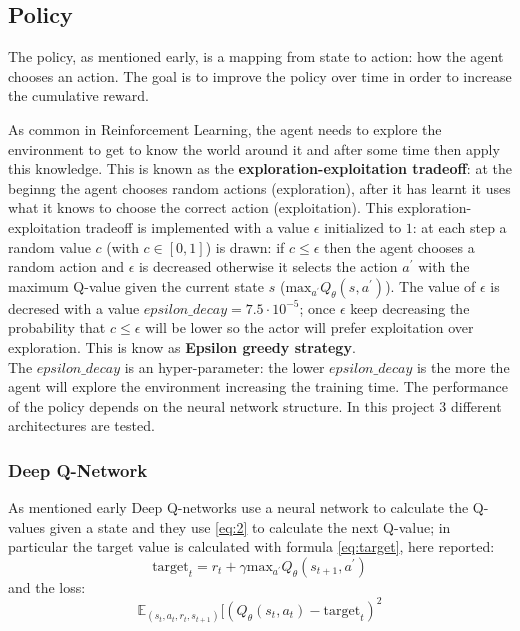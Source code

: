 \documentclass[14pt]{extarticle}
\def\sp{\vspace{5pt}}
\def\pp{\vspace{10pt}\newline}
\begin{document}
\begin{flushleft}
	
	\subsection{Policy}
	\sp
	The policy, as mentioned early, is a mapping from state to action: how the agent chooses an action. The goal is to improve the policy over time in order to increase the cumulative reward. \pp
	
	As common in Reinforcement Learning, the agent needs to explore the environment to get to know the world around it and after some time then apply this knowledge.  This is known as the \textbf{exploration-exploitation tradeoff}: at the beginng the agent chooses random actions (exploration), after it has learnt it uses what it knows to choose the correct action (exploitation). \pp
	This exploration-exploitation tradeoff is implemented with a value $\epsilon$ initialized to $1$: at each step a random value $c$ (with $c \in [0,1]$) is drawn: if $c\leq\epsilon$ then the agent chooses a random action and $\epsilon$ is decreased otherwise it selects the action $a^\prime$ with the maximum Q-value given the current state $s$ ($\text{max}_{a^\prime}Q_{\theta}(s,a^\prime)$).
	\pp
	The value of $\epsilon$ is decresed with a value $epsilon\_decay = 7.5 \cdot 10^{-5}$; once $\epsilon$ keep decreasing the probability that $c\leq\epsilon$ will be lower so the actor will prefer exploitation over exploration. This is know as \textbf{Epsilon greedy strategy}.\\
	The $epsilon\_decay$ is an hyper-parameter: the lower $epsilon\_decay$ is the more the agent will explore the environment increasing the training time. 
	\pp
	The performance of the policy depends on the neural network structure. In this project 3 different architectures are tested. %
	
	\subsubsection{Deep Q-Network}
	\sp
	As mentioned early Deep Q-networks use a neural network to calculate the Q-values given a state and they use \ref{eq:2} to calculate the next Q-value; in particular the target value is calculated with formula \ref{eq:target}, here reported:
	\[
\text{target}_t = r_t + \gamma\text{max}_{a^\prime}Q_{\theta}(s_{t+1},a^{\prime})
\]
and the loss:
\[\mathbb{E}_{(s_t,a_t,r_t,s_{t+1})}[(Q_{\theta}(s_t,a_t) - \text{target}_t)^2\] 


\end{flushleft}
\end{document}
